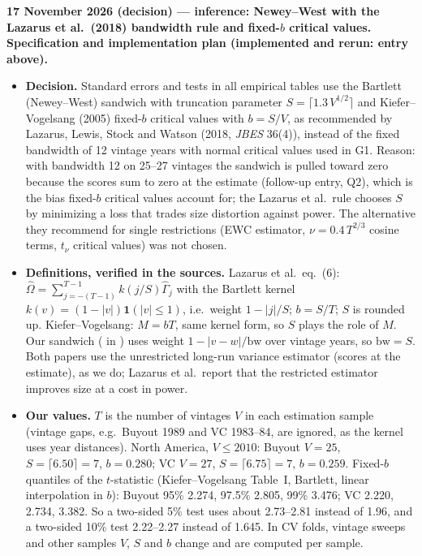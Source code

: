 \documentclass[11pt]{article}
\newcommand{\code}[1]{\texttt{\detokenize{#1}}}
\newcommand{\file}[1]{\path{#1}}
\begin{document}
\textbf{17 November 2026 (decision) --- inference: Newey--West with the Lazarus et al.\ (2018) bandwidth rule and fixed-$b$ critical values. Specification and implementation plan (implemented and rerun: entry above).}
\begin{itemize}
\item \textbf{Decision.} Standard errors and tests in all empirical tables use the Bartlett (Newey--West) sandwich with truncation parameter $S=\lceil 1.3\,V^{1/2}\rceil$ and Kiefer--Vogelsang (2005) fixed-$b$ critical values with $b=S/V$, as recommended by Lazarus, Lewis, Stock and Watson (2018, \emph{JBES} 36(4)), instead of the fixed bandwidth of 12 vintage years with normal critical values used in G1. Reason: with bandwidth 12 on 25--27 vintages the sandwich is pulled toward zero because the scores sum to zero at the estimate (follow-up entry, Q2), which is the bias fixed-$b$ critical values account for; the Lazarus et al.\ rule chooses $S$ by minimizing a loss that trades size distortion against power. The alternative they recommend for single restrictions (EWC estimator, $\nu=0.4\,T^{2/3}$ cosine terms, $t_\nu$ critical values) was not chosen.
\item \textbf{Definitions, verified in the sources.} Lazarus et al.\ eq.~(6): $\widehat\Omega=\sum_{j=-(T-1)}^{T-1}k(j/S)\widehat\Gamma_j$ with the Bartlett kernel $k(v)=(1-|v|)\mathbf 1(|v|\le 1)$, i.e.\ weight $1-|j|/S$; $b=S/T$; $S$ is rounded up. Kiefer--Vogelsang: $M=bT$, same kernel form, so $S$ plays the role of $M$. Our sandwich (\code{bartlett.weight()} in \file{helper/inference.R}) uses weight $1-|v-w|/\mathrm{bw}$ over vintage years, so $\mathrm{bw}=S$. Both papers use the unrestricted long-run variance estimator (scores at the estimate), as we do; Lazarus et al.\ report that the restricted estimator improves size at a cost in power.
\item \textbf{Our values.} $T$ is the number of vintages $V$ in each estimation sample (vintage gaps, e.g.\ Buyout 1989 and VC 1983--84, are ignored, as the kernel uses year distances). North America, $V\le2010$: Buyout $V=25$, $S=\lceil 6.50\rceil=7$, $b=0.280$; VC $V=27$, $S=\lceil 6.75\rceil=7$, $b=0.259$. Fixed-$b$ quantiles of the $t$-statistic (Kiefer--Vogelsang Table~I, Bartlett, linear interpolation in $b$): Buyout 95\% 2.274, 97.5\% 2.805, 99\% 3.476; VC 2.220, 2.734, 3.382. So a two-sided 5\% test uses about 2.73--2.81 instead of 1.96, and a two-sided 10\% test 2.22--2.27 instead of 1.645. In CV folds, vintage sweeps and other samples $V$, $S$ and $b$ change and are computed per sample.

\end{itemize}
\end{document}
